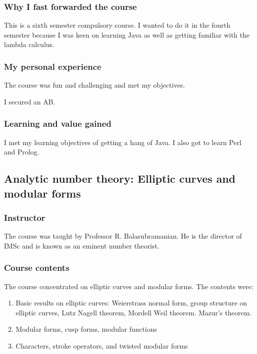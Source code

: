 \documentclass[a4paper]{amsart}
\begin{document}
\subsubsection{Why I fast forwarded the course}

This is a sixth semester compulsory course. I wanted to do it in the fourth semester because I was keen on learning
Java as well as getting familiar with the lambda calculus. 

\subsubsection{My personal experience}

The course was fun and challenging and met my objectives.

I secured an AB.

\subsubsection{Learning and value gained}

I met my learning objectives of getting a hang of Java. I also got to learn Perl and Prolog.

\subsection{Analytic number theory: Elliptic curves and modular forms}

\subsubsection{Instructor}

The course was taught by Professor R. Balasubramanian. He is the director of IMSc and is known as an eminent
number theorist.

\subsubsection{Course contents}

The course concentrated on elliptic curves and modular forms. The contents were:

\begin{enumerate}

\item Basic results on elliptic curves: Weierstrass normal form, group structure on elliptic curves, Lutz Nagell theorem,
  Mordell Weil theorem. Mazur's theorem.

\item Modular forms, cusp forms, modular functions

\item Characters, stroke operators, and twisted modular forms

\end{enumerate}
\end{document}
